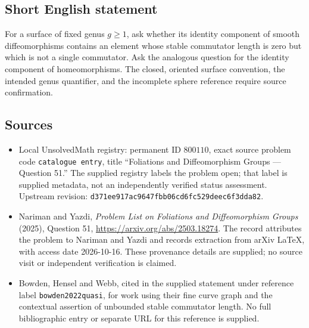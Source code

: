 \documentclass[11pt]{article}
\begin{document}
\subsection{Short English statement}
For a surface of fixed genus \(g\geq1\), ask whether its identity component of smooth diffeomorphisms contains an element whose stable commutator length is zero but which is not a single commutator. Ask the analogous question for the identity component of homeomorphisms. The closed, oriented surface convention, the intended genus quantifier, and the incomplete sphere reference require source confirmation.
\subsection{Sources}
\begin{itemize}
\item Local UnsolvedMath registry: permanent ID \(800110\), exact source problem code \texttt{catalogue entry}, title ``Foliations and Diffeomorphism Groups --- Question 51.'' The supplied registry labels the problem open; that label is supplied metadata, not an independently verified status assessment. Upstream revision: \texttt{d371ee917ac9647fbb06cd6fc529deec6f3dda82}.
\item Nariman and Yazdi, \emph{Problem List on Foliations and Diffeomorphism Groups} (2025), Question 51, \url{https://arxiv.org/abs/2503.18274}. The record attributes the problem to Nariman and Yazdi and records extraction from arXiv LaTeX, with access date 2026-10-16. These provenance details are supplied; no source visit or independent verification is claimed.
\item Bowden, Hensel and Webb, cited in the supplied statement under reference label \texttt{bowden2022quasi}, for work using their fine curve graph and the contextual assertion of unbounded stable commutator length. No full bibliographic entry or separate URL for this reference is supplied.
\end{itemize}
\end{document}
